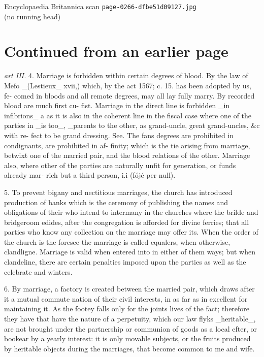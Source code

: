 \documentclass{article}
\begin{document}
\begin{center}
{\Large Encyclopaedia Britannica scan \texttt{page-0266-dfbe51d09127.jpg}}\\[0.5em]
(no running head)
\end{center}
\section*{Continued from an earlier page}
\textit{art III.}
4. Marriage is forbidden within certain degrees of blood. By the law of Mefo \_(Lestieux\_ xvii,) which, by the act 1567; c. 15. has been adopted by us, fe- comed in bloods and all remote degrees, may all lay fully marry. By recorded blood are much first cu- fist. Marriage in the direct line is forbidden \_in infibrions\_ a as it is also in the coherent line in the fiscal case where one of the parties in \_is too\_, \_parents to the other, as grand-uncle, great grand-uncles, \&c with re- fect to be grand dressing. See. The fans degrees are prohibited in condignants, are prohibited in af- finity; which is the tie arising from marriage, betwixt one of the married pair, and the blood relations of the other. Marriage also, where other of the parties are naturally unfit for generation, or funds already mar- rich but a third person, i.i (fójé per null).

5. To prevent bigany and nectitious marriages, the church has introduced production of banks which is the ceremony of publishing the names and obligations of their who intend to intermany in the churches where the brilde and bridgeroom edides, after the congregation is afforded for divine ferries; that all parties who know any collection on the marriage may offer its. When the order of the church is the foresee the marriage is called equalers, when otherwise, clandligne. Marriage is valid when entered into in either of them ways; but when clandeline, there are certain penalties imposed upon the parties as well as the celebrate and winters.

6. By marriage, a factory is created between the married pair, which draws after it a mutual commute nation of their civil interests, in as far as in excellent for maintaining it. As the footey falls only for the joints lives of the fact; therefore they have that have the nature of a perpetuity, which our law flyks \_heritable\_, are not brought under the partnership or communion of goods as a local efter, or bookear by a yearly interest: it is only movable subjects, or the fruits produced by heritable objects during the marriages, that become common to me and wife.
\end{document}
